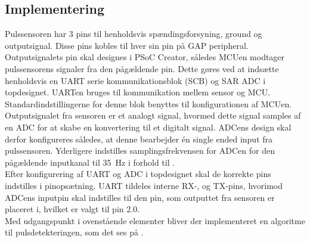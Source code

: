 \subsection{Implementering} \label{puls_impl}
Pulssensoren har 3 pins til henholdsvis spændingsforsyning, ground og outputsignal. Disse pins kobles til hver sin pin på GAP peripheral. Outputsignalets pin skal designes i PSoC Creator, således MCUen modtager pulssensorens signaler fra den pågældende pin. Dette gøres ved at indsætte henholdsvis en UART serie kommunikationsblok (SCB) og SAR ADC i topdesignet. UARTen bruges til kommunikation mellem sensor og MCU. Standardindstillingerne for denne blok benyttes til konfigurationen af MCUen. \newline
Outputsignalet fra sensoren er et analogt signal, hvormed dette signal samples af en ADC for at skabe en konvertering til et digitalt signal. ADCens design skal derfor konfigureres således, at denne bearbejder én single ended input fra pulssensoren. Yderligere indstilles samplingsfrekvensen for ADCen for den pågældende inputkanal til 35~Hz i forhold til . \\
Efter konfigurering af UART og ADC i topdesignet skal de korrekte pins indstilles i pinopsætning. UART tildeles interne RX-, og TX-pins, hvorimod ADCens inputpin skal indstilles til den pin, som outputtet fra sensoren er placeret i, hvilket er valgt til pin 2.0. \\
Med udgangspunkt i ovenstående elementer bliver der implementeret en algoritme til pulsdetekteringen, som det ses på .
